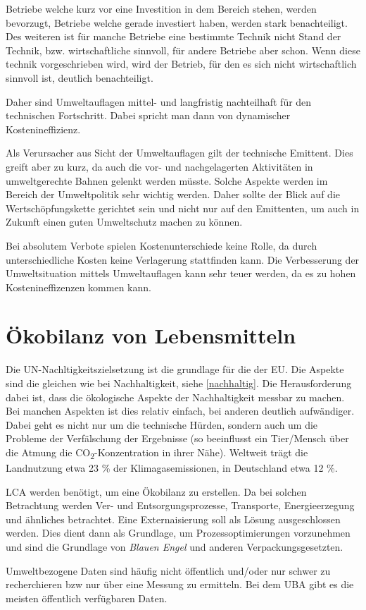 \documentclass[11pt]{scrbook}
\begin{document}
Betriebe welche kurz vor eine Investition in dem Bereich stehen, werden bevorzugt, Betriebe welche gerade investiert haben, werden stark benachteiligt.
Des weiteren ist für manche Betriebe eine bestimmte Technik nicht Stand der Technik, bzw. wirtschaftliche sinnvoll, für andere Betriebe aber schon.
Wenn diese technik vorgeschrieben wird, wird der Betrieb, für den es sich nicht wirtschaftlich sinnvoll ist, deutlich benachteiligt.

Daher sind Umweltauflagen mittel- und langfristig nachteilhaft für den technischen Fortschritt.
Dabei spricht man dann von dynamischer Kostenineffizienz.

Als Verursacher aus Sicht der Umweltauflagen gilt der technische Emittent.
Dies greift aber zu kurz, da auch die vor- und nachgelagerten Aktivitäten in umweltgerechte Bahnen gelenkt werden müsste.
Solche Aspekte werden im Bereich der Umweltpolitik sehr wichtig werden.
Daher sollte der Blick auf die Wertschöpfungskette gerichtet sein und nicht nur auf den Emittenten, um auch in Zukunft einen guten Umweltschutz machen zu können.

Bei absolutem Verbote spielen Kostenunterschiede keine Rolle, da durch unterschiedliche Kosten keine Verlagerung stattfinden kann.
Die Verbesserung der Umweltsituation mittels Umweltauflagen kann sehr teuer werden, da es zu hohen Kostenineffizenzen kommen kann.

\section{Ökobilanz von Lebensmitteln}

Die \ac{UN}-Nachltigkeitszielsetzung ist die grundlage für die der \ac{EU}.
Die Aspekte sind die gleichen wie bei Nachhaltigkeit, siehe \cref{nachhaltig}.
Die Herausforderung dabei ist, dass die ökologische Aspekte der Nachhaltigkeit messbar zu machen.
Bei manchen Aspekten ist dies relativ einfach, bei anderen deutlich aufwändiger.
Dabei geht es nicht nur um die technische Hürden, sondern auch um die Probleme der Verfälschung der Ergebnisse (so beeinflusst ein Tier/Mensch über die Atmung die CO\textsubscript{2}-Konzentration in ihrer Nähe).
Weltweit trägt die Landnutzung etwa 23 \% der Klimagasemissionen, in Deutschland etwa 12 \%.

\ac{LCA} werden benötigt, um eine Ökobilanz zu erstellen.
Da bei solchen Betrachtung werden Ver- und Entsorgungsprozesse, Transporte, Energieerzegung und ähnliches betrachtet.
Eine Externaisierung soll als Lösung ausgeschlossen werden.
Dies dient dann als Grundlage, um Prozessoptimierungen vorzunehmen und sind die Grundlage von \textit{Blauen Engel} und anderen Verpackungsgesetzten.

Umweltbezogene Daten sind häufig nicht öffentlich und/oder nur schwer zu recherchieren bzw nur über eine Messung zu ermitteln.
Bei dem \ac{UBA} gibt es die meisten öffentlich verfügbaren Daten.




\end{document}

